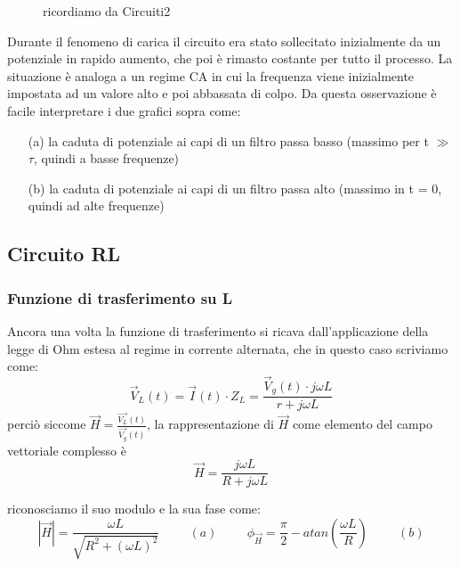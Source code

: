 \documentclass{article}
\theoremstyle{definition}
\begin{document}
\begin{figure}[!h]
\caption{ricordiamo da Circuiti2}
\caption*{}
\label{fig:RC_daCircuiti2}
\end{figure}

\noindent Durante il fenomeno di carica il circuito era stato sollecitato inizialmente da un potenziale in rapido aumento, che poi è rimasto costante per tutto il processo. La situazione è analoga a un regime CA in cui la frequenza viene inizialmente impostata ad un valore alto e poi abbassata di colpo. Da questa osservazione è facile interpretare i due grafici sopra come:
\begin{enumerate}
    \item[(a)] la caduta di potenziale ai capi di un filtro passa basso (massimo per t \(\gg\) \(\tau\), quindi a basse frequenze) 
    \item[(b)] la caduta di potenziale ai capi di un filtro passa alto (massimo in t = 0, quindi ad alte frequenze)
\end{enumerate}

\pagebreak
\subsection{Circuito RL}
\subsubsection{Funzione di trasferimento su L}
Ancora una volta la funzione di trasferimento si ricava dall'applicazione della legge di Ohm estesa al regime in corrente alternata, che in questo caso scriviamo come:
\[\vec{V}_{L}(t) = \vec{I}(t) \cdot Z_{L} = \frac{\vec{V}_{g}(t) \cdot j\omega L }{r + j\omega L}\]
perciò siccome \(\vec{H} = \frac{\vec{V_{L}}(t)}{\vec{V_{g}}(t)}\), la rappresentazione di \(\vec{H}\) come elemento del campo vettoriale complesso è
\[\vec{H} = \frac{j \omega L}{R + j \omega L}\]

riconosciamo il suo modulo e la sua fase come:
\[ \left| \vec{H} \right| = \frac{\omega L}{\sqrt{R^{2} + (\omega L )^{2}}}\hspace{1cm} (a)\hspace{1cm} \phi_{\vec{H}} = \frac{\pi}{2} - atan\left(\frac{\omega L }{R}\right)\hspace{1cm} (b)\]
\end{document}
